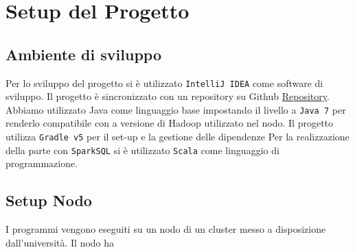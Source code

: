 \section{Setup del Progetto}

\subsection{Ambiente di sviluppo}

Per lo sviluppo del progetto si è utilizzato \texttt{IntelliJ IDEA} come software di sviluppo.
Il progetto è sincronizzato con un repository su Github \href{https://github.com/valgi0/bd-project2019}{Repository}.
Abbiamo utilizzato Java come linguaggio base impostando il livello a \texttt{Java 7} per renderlo compatibile
con a versione di Hadoop utilizzato nel nodo. Il progetto utilizza \texttt{Gradle v5} per il set-up
e la gestione delle dipendenze
Per la realizzazione della parte con \texttt{SparkSQL} si è utilizzato \texttt{Scala} come linguaggio di programmazione.

\subsection{Setup Nodo}

I programmi vengono eseguiti su un nodo di un cluster messo a disposizione dall'università. Il nodo ha